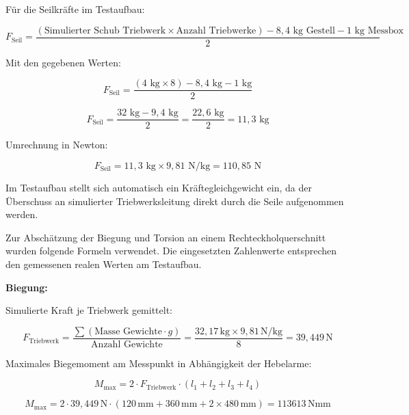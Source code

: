 Für die Seilkräfte im Testaufbau:

\begin{equation}
F_{\text{Seil}} = \frac{(\text{Simulierter Schub Triebwerk} \times \text{Anzahl Triebwerke}) - 8,4 \text{ kg Gestell} - 1 \text{ kg Messbox}}{2}
\end{equation}

Mit den gegebenen Werten:

\begin{equation}
F_{\text{Seil}} = \frac{(4 \text{ kg} \times 8) - 8,4 \text{ kg} - 1 \text{ kg}}{2}
\end{equation}

\begin{equation}
F_{\text{Seil}} = \frac{32 \text{ kg} - 9,4 \text{ kg}}{2} = \frac{22,6 \text{ kg}}{2} = 11,3 \text{ kg}
\end{equation}

Umrechnung in Newton:

\begin{equation}
F_{\text{Seil}} = 11,3 \text{ kg} \times 9,81 \text{ N/kg} = 110,85 \text{ N}
\end{equation}

Im Testaufbau stellt sich automatisch ein Kräftegleichgewicht ein, da der Überschuss an simulierter Triebwerksleitung direkt durch die Seile aufgenommen werden. 

Zur Abschätzung der Biegung und Torsion an einem Rechteckholquerschnitt wurden folgende Formeln verwendet. Die eingesetzten Zahlenwerte entsprechen den gemessenen realen Werten am Testaufbau.

\textbf{Biegung:}

Simulierte Kraft je Triebwerk gemittelt:

\begin{equation}
F_{\text{Triebwerk}} = \frac{\sum (\text{Masse Gewichte} \cdot g)}{\text{Anzahl Gewichte}}
= \frac{32,17\,\text{kg} \times 9,81\,\text{N/kg}}{8} = 39,449\,\text{N}
\end{equation}

Maximales Biegemoment am Messpunkt in Abhängigkeit der Hebelarme:

\begin{equation}
M_{\text{max}} = 2 \cdot F_{\text{Triebwerk}} \cdot (l_1 + l_2 + l_3 + l_4)
\end{equation}

\begin{equation}
M_{\text{max}} = 2 \cdot 39,449\,\text{N} \cdot (120\,\text{mm} + 360\,\text{mm} + 2 \times 480\,\text{mm}) = 113613\,\text{Nmm}
\end{equation}

